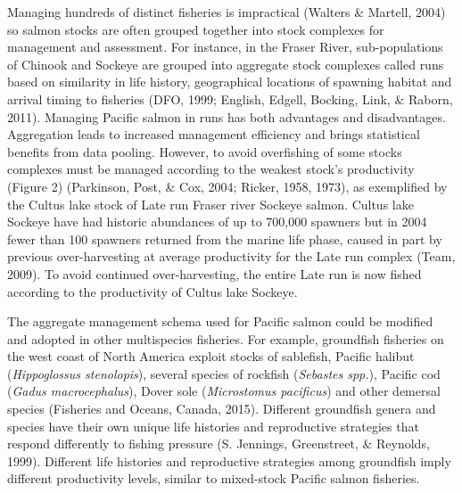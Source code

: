 \documentclass[12pt,]{scrartcl}
\begin{document}
Managing hundreds of distinct fisheries is impractical (Walters \&
Martell, 2004) so salmon stocks are often grouped together into stock
complexes for management and assessment. For instance, in the Fraser
River, sub-populations of Chinook and Sockeye are grouped into aggregate
stock complexes called runs based on similarity in life history,
geographical locations of spawning habitat and arrival timing to
fisheries (DFO, 1999; English, Edgell, Bocking, Link, \& Raborn, 2011).
Managing Pacific salmon in runs has both advantages and disadvantages.
Aggregation leads to increased management efficiency and brings
statistical benefits from data pooling. However, to avoid overfishing of
some stocks complexes must be managed according to the weakest stock's
productivity (Figure 2) (Parkinson, Post, \& Cox, 2004; Ricker, 1958,
1973), as exemplified by the Cultus lake stock of Late run Fraser river
Sockeye salmon. Cultus lake Sockeye have had historic abundances of up
to 700,000 spawners but in 2004 fewer than 100 spawners returned from
the marine life phase, caused in part by previous over-harvesting at
average productivity for the Late run complex (Team, 2009). To avoid
continued over-harvesting, the entire Late run is now fished according
to the productivity of Cultus lake Sockeye.

The aggregate management schema used for Pacific salmon could be
modified and adopted in other multispecies fisheries. For example,
groundfish fisheries on the west coast of North America exploit stocks
of sablefish, Pacific halibut (\emph{Hippoglossus stenolopis}), several
species of rockfish (\emph{Sebastes spp.}), Pacific cod (\emph{Gadus
macrocephalus}), Dover sole (\emph{Microstomus pacificus}) and other
demersal species (Fisheries and Oceans, Canada, 2015). Different
groundfish genera and species have their own unique life histories and
reproductive strategies that respond differently to fishing pressure (S.
Jennings, Greenstreet, \& Reynolds, 1999). Different life histories and
reproductive strategies among groundfish imply different productivity
levels, similar to mixed-stock Pacific salmon fisheries.
\end{document}
